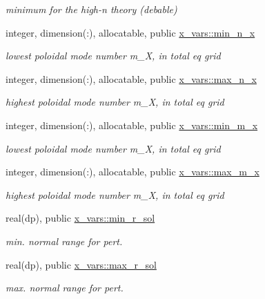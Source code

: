 \begin{DoxyCompactItemize}
\begin{DoxyCompactList}\small\item\em minimum for the high-\/n theory (debable) \end{DoxyCompactList}\item 
integer, dimension(\+:), allocatable, public \hyperlink{namespacex__vars_a07485e5ebf54c236ae6f3c25e9cd2a93}{x\+\_\+vars\+::min\+\_\+n\+\_\+x}
\begin{DoxyCompactList}\small\item\em lowest poloidal mode number {\ttfamily m\+\_\+X}, in total eq grid \end{DoxyCompactList}\item 
integer, dimension(\+:), allocatable, public \hyperlink{namespacex__vars_a2f04400f8c1489db3f2d66fa972852a5}{x\+\_\+vars\+::max\+\_\+n\+\_\+x}
\begin{DoxyCompactList}\small\item\em highest poloidal mode number {\ttfamily m\+\_\+X}, in total eq grid \end{DoxyCompactList}\item 
integer, dimension(\+:), allocatable, public \hyperlink{namespacex__vars_aae62c7b4f8043dcccad97454b5857690}{x\+\_\+vars\+::min\+\_\+m\+\_\+x}
\begin{DoxyCompactList}\small\item\em lowest poloidal mode number {\ttfamily m\+\_\+X}, in total eq grid \end{DoxyCompactList}\item 
integer, dimension(\+:), allocatable, public \hyperlink{namespacex__vars_aad66540f255243f66887442b9ef3c745}{x\+\_\+vars\+::max\+\_\+m\+\_\+x}
\begin{DoxyCompactList}\small\item\em highest poloidal mode number {\ttfamily m\+\_\+X}, in total eq grid \end{DoxyCompactList}\item 
real(dp), public \hyperlink{namespacex__vars_a50c610efcf5afa4ec4b0eb7119b5d520}{x\+\_\+vars\+::min\+\_\+r\+\_\+sol}
\begin{DoxyCompactList}\small\item\em min. normal range for pert. \end{DoxyCompactList}\item 
real(dp), public \hyperlink{namespacex__vars_a0f45dfddb928623424eeb8b8bdd2b0f9}{x\+\_\+vars\+::max\+\_\+r\+\_\+sol}
\begin{DoxyCompactList}\small\item\em max. normal range for pert. \end{DoxyCompactList}\item 

\end{DoxyCompactItemize}
